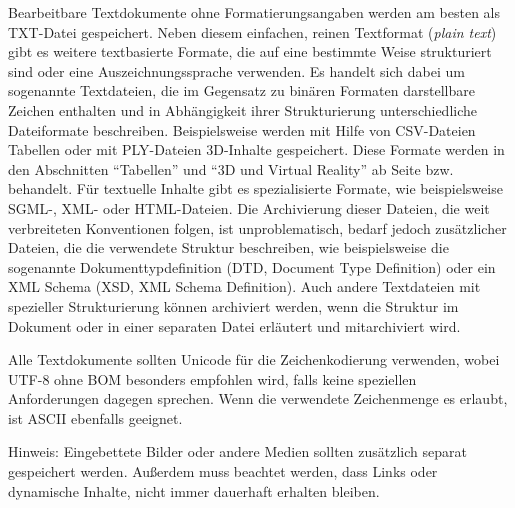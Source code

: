 Bearbeitbare Textdokumente ohne Formatierungsangaben werden am besten als TXT-Datei gespeichert. Neben diesem einfachen, reinen Textformat (\emph{plain text}) gibt es weitere textbasierte Formate, die auf eine bestimmte Weise strukturiert sind oder eine Auszeichnungssprache verwenden. Es handelt sich dabei um sogenannte Textdateien, die im Gegensatz zu binären Formaten darstellbare Zeichen enthalten und in Abhängigkeit ihrer Strukturierung unterschiedliche Dateiformate beschreiben. Beispielsweise werden mit Hilfe von CSV-Dateien Tabellen oder mit PLY-Dateien 3D-Inhalte gespeichert. Diese Formate werden in den Abschnitten "`Tabellen"' und "`3D und Virtual Reality"' ab Seite \pageref{tabellen} bzw. \pageref{3D} behandelt. Für textuelle Inhalte gibt es spezialisierte Formate, wie beispielsweise SGML-, XML- oder HTML-Dateien. Die Archivierung dieser Dateien, die weit verbreiteten Konventionen folgen, ist unproblematisch, bedarf jedoch zusätzlicher Dateien, die die verwendete Struktur beschreiben, wie beispielsweise die sogenannte Dokumenttypdefinition (DTD, Document Type Definition) oder ein XML Schema (XSD, XML Schema Definition). Auch andere Textdateien mit spezieller Strukturierung können archiviert werden, wenn die Struktur im Dokument oder in einer separaten Datei erläutert und mitarchiviert wird.

Alle Textdokumente sollten Unicode für die Zeichenkodierung verwenden, wobei UTF-8 ohne BOM besonders empfohlen wird, falls keine speziellen Anforderungen dagegen sprechen. Wenn die verwendete Zeichenmenge es erlaubt, ist ASCII ebenfalls geeignet.

Hinweis: Eingebettete Bilder oder andere Medien sollten zusätzlich separat gespeichert werden. Außerdem muss beachtet werden, dass Links oder dynamische Inhalte, nicht immer dauerhaft erhalten bleiben.


